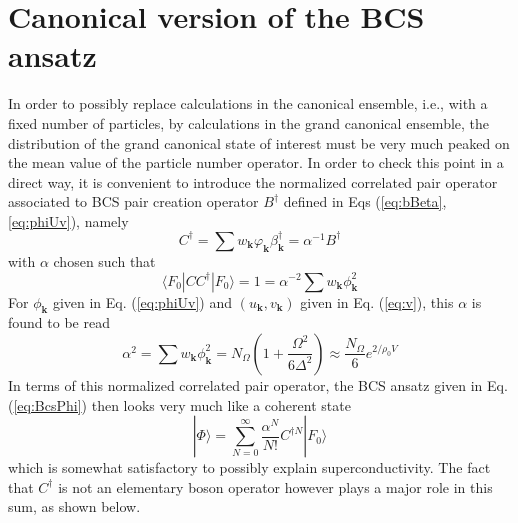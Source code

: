 \documentclass[aps,prb,preprint,groupedaddress,amsmath]{revtex4}
\newcommand{\vk}{\ensuremath{\mathbf{k}}}
\newcommand{\dg}{\ensuremath{\dagger}}
\begin{document}
\section{Canonical version of the BCS ansatz}
In order to possibly replace calculations in the  canonical ensemble, i.e., with a fixed number of particles, by calculations in the grand canonical ensemble, the  distribution of the grand canonical state of interest  must be very much peaked on the mean value of the particle number operator.  In order to check this point in a direct way, it is convenient to introduce the normalized correlated pair operator associated to BCS pair creation operator $B^\dg$ defined in Eqs (\ref{eq:bBeta},\ref{eq:phiUv}), namely
\begin{equation}\label{eq:c}
{C}^\dg=\sum{w_\vk}{\varphi}_\vk\beta^\dg_\vk=\alpha^{-1}B^\dg
\end{equation} 
with $\alpha$ chosen such that 
\begin{equation}
\langle{}F_0|CC^\dg|F_0\rangle=1=\alpha^{-2}\sum{w_\vk}\phi_\vk^2
\end{equation}
For $\phi_\vk$ given in Eq. (\ref{eq:phiUv}) and $(u_\vk,v_\vk)$ given in Eq. (\ref{eq:v}), this $\alpha$ is found to be read
\begin{equation}\label{eq:alpha}
\alpha^{2}=\sum{w_\vk}\phi_\vk^2=N_\Omega\left(1+\frac{\Omega^2}{6\Delta^2}\right)\approx\frac{N_\Omega}6e^{2/\rho_0V}
\end{equation}
In terms of this normalized correlated pair operator, the BCS ansatz given in Eq. (\ref{eq:BcsPhi}) then looks very much like a coherent state
\begin{equation}
|\Phi{\rangle}=\sum^\infty_{N=0}\frac{\alpha^N}{N!}C^{\dg{}N}|F_0{\rangle}
\label{eq:BcsPhiNorl}
\end{equation}
which is somewhat satisfactory to possibly explain superconductivity. The fact that $C^\dg$ is not an elementary boson operator however plays a major role in this sum, as shown below.
\end{document}
